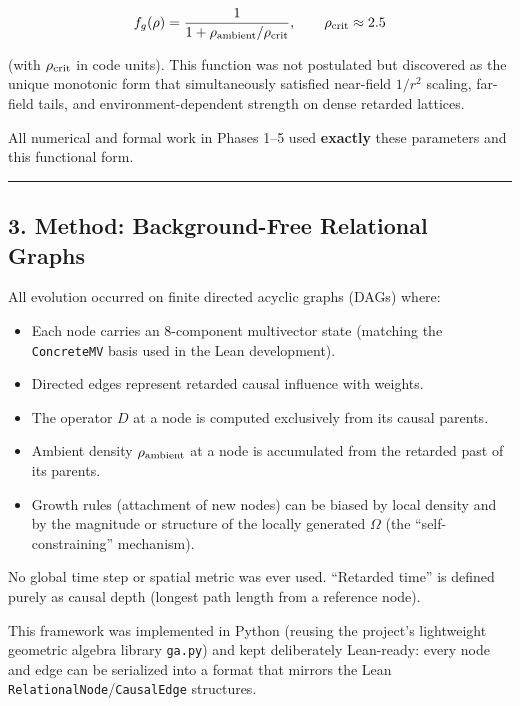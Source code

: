 \documentclass[
  11pt,
  a4paper,
]{article}
\providecommand{\tightlist}{%
  \setlength{\itemsep}{0pt}\setlength{\parskip}{0pt}}
\begin{document}
\[
f_g(\rho) = \frac{1}{1 + \rho_{\rm ambient}/\rho_{\rm crit}}, \qquad \rho_{\rm crit} \approx 2.5
\]

(with \(\rho_{\rm crit}\) in code units). This function was not
postulated but discovered as the unique monotonic form that
simultaneously satisfied near-field \(1/r^2\) scaling, far-field tails,
and environment-dependent strength on dense retarded lattices.

All numerical and formal work in Phases 1--5 used \textbf{exactly} these
parameters and this functional form.

\begin{center}\rule{0.5\linewidth}{0.5pt}\end{center}

\subsection{3. Method: Background-Free Relational
Graphs}\label{method-background-free-relational-graphs}

All evolution occurred on finite directed acyclic graphs (DAGs) where:

\begin{itemize}
\tightlist
\item
  Each node carries an 8-component multivector state (matching the
  \texttt{ConcreteMV} basis used in the Lean development).
\item
  Directed edges represent retarded causal influence with weights.
\item
  The operator \(D\) at a node is computed exclusively from its causal
  parents.
\item
  Ambient density \(\rho_{\rm ambient}\) at a node is accumulated from
  the retarded past of its parents.
\item
  Growth rules (attachment of new nodes) can be biased by local density
  and by the magnitude or structure of the locally generated \(\Omega\)
  (the ``self-constraining'' mechanism).
\end{itemize}

No global time step or spatial metric was ever used. ``Retarded time''
is defined purely as causal depth (longest path length from a reference
node).

This framework was implemented in Python (reusing the project's
lightweight geometric algebra library \texttt{ga.py}) and kept
deliberately Lean-ready: every node and edge can be serialized into a
format that mirrors the Lean \texttt{RelationalNode}/\texttt{CausalEdge}
structures.
\end{document}
